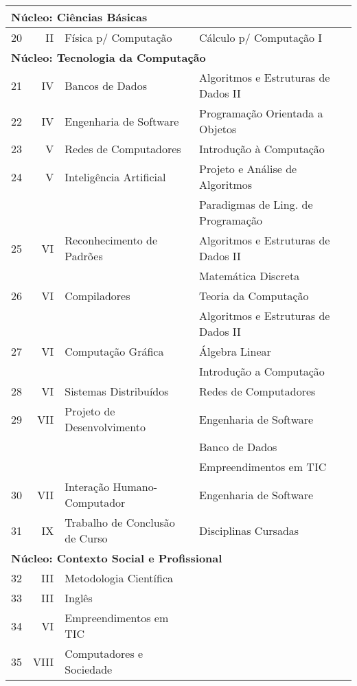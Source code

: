 \documentclass[
	12pt,				%
	openright,			%
  oneside,     %
	a4paper,			%
	english,			%
	french,				%
	spanish,			%
	brazil				%
	]{abntex2}
\begin{document}
\begin{apendicesenv}
\begin{landscape}
\begin{longtable}{r|r|l|l|l}
\multicolumn{5}{l}{\textbf{Núcleo: Ciências Básicas}} \\ \hline
    20    & II    & Física p/ Computação & Cálculo p/ Computação I &        \\ \hline

\multicolumn{5}{l}{\textbf{Núcleo: Tecnologia da Computação}} \\ \hline
    21    & IV    & Bancos de Dados & Algoritmos e Estruturas de Dados II &        \\ \hline
    22    & IV    & Engenharia de Software & Programação Orientada a Objetos &       \\ \hline
    23    & V     & Redes de Computadores & Introdução à Computação &       \\ \hline
    24    & V     & Inteligência Artificial & Projeto e Análise de Algoritmos &       \\ 
          &       &       & Paradigmas de Ling. de Programação &          \\ \hline
    25    & VI    & Reconhecimento de Padrões &  Algoritmos e Estruturas de Dados II &  \\
          &       &       & Matemática Discreta &       \\ \hline
    26    & VI    & Compiladores & Teoria da Computação &       \\ 
              &       &       & Algoritmos e Estruturas de Dados II &         \\ \hline
    27    & VI    & Computação Gráfica & Álgebra Linear &        \\ 
          &       &       & Introdução a Computação &         \\ \hline
    28    & VI    & Sistemas Distribuídos & Redes de Computadores &        \\ \hline
    29    & VII   & Projeto de Desenvolvimento & Engenharia de Software &   \\ 
          &       &       & Banco de Dados &        \\ 
          &       &       & Empreendimentos em TIC &        \\ \hline
    30    & VII   & Interação Humano-Computador & Engenharia de Software &        \\ \hline
    31    & IX    & Trabalho de Conclusão de Curso & Disciplinas Cursadas &       \\ \hline

\multicolumn{5}{l}{\textbf{Núcleo: Contexto Social e Profissional}} \\ \hline
    32    & III   & Metodologia Científica &       &       \\ \hline
    33    & III   & Inglês &       &        \\ \hline
    34    & VI    & Empreendimentos em TIC &       &        \\ \hline
    35    & VIII  & Computadores e Sociedade &       &        \\ \hline



\end{longtable}
\end{landscape}
\end{apendicesenv}
\end{document}
